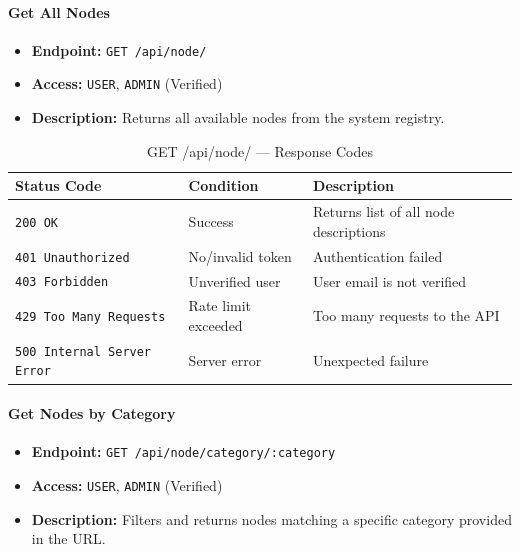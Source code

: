 \paragraph{Get All Nodes}
\label{subsubsec:get-all-nodes}

\begin{itemize}
  \item \textbf{Endpoint:} \texttt{GET /api/node/}
  \item \textbf{Access:} \texttt{USER}, \texttt{ADMIN} (Verified)
  \item \textbf{Description:} Returns all available nodes from the system registry.
\end{itemize}

\begin{table}[H]
\centering
\renewcommand{\arraystretch}{1.3}
\begin{tabularx}{\textwidth}{|l|l|X|}
\hline
\textbf{Status Code} & \textbf{Condition} & \textbf{Description} \\
\hline
\texttt{200 OK}           & Success      & Returns list of all node descriptions \\
\hline
\texttt{401 Unauthorized} & No/invalid token & Authentication failed \\
\hline
\texttt{403 Forbidden}    & Unverified user & User email is not verified \\
\hline
\texttt{429 Too Many Requests} & Rate limit exceeded & Too many requests to the API \\
\hline
\texttt{500 Internal Server Error} & Server error & Unexpected failure \\
\hline
\end{tabularx}
\caption{GET /api/node/ — Response Codes}
\label{tab:get-all-nodes-responses}
\end{table}
\FloatBarrier

\paragraph{Get Nodes by Category}
\label{subsubsec:get-nodes-by-category}

\begin{itemize}
  \item \textbf{Endpoint:} \texttt{GET /api/node/category/:category}
  \item \textbf{Access:} \texttt{USER}, \texttt{ADMIN} (Verified)
  \item \textbf{Description:} Filters and returns nodes matching a specific category provided in the URL.
\end{itemize}

